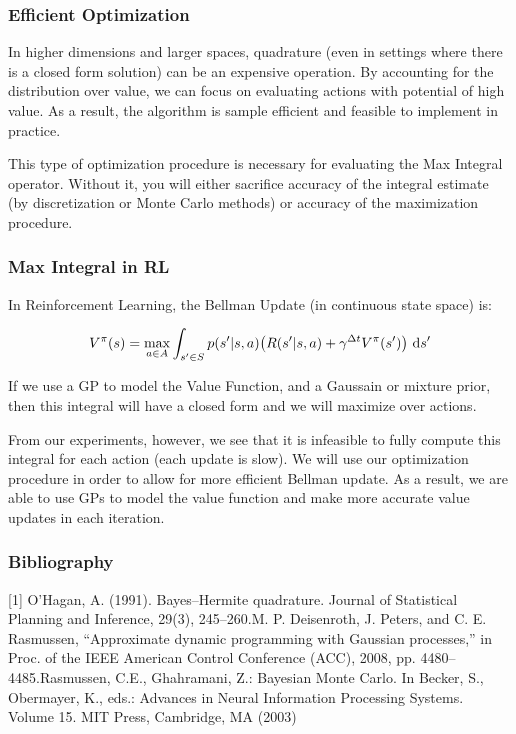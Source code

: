 \documentclass[9pt]{beamer}
\begin{document}
\begin{frame}
\frametitle{Efficient Optimization}
In higher dimensions and larger spaces, quadrature (even in settings where there is a closed form solution) can be an expensive operation. By accounting for the distribution over value, we can focus on evaluating actions with potential of high value. As a result, the algorithm is sample efficient and feasible to implement in practice.\newline

This type of optimization procedure is necessary for evaluating the Max Integral operator. Without it, you will either sacrifice accuracy of the integral estimate (by discretization or Monte Carlo methods) or accuracy of the maximization procedure.\newline \newline
\end{frame}

\begin{frame}
\frametitle{Max Integral in RL}
In Reinforcement Learning, the Bellman Update (in continuous state space) is:

\[V^{\pi}(s) = \max_{a \in A} \int_{s' \in S} p(s'|s,a)\big(R(s'|s,a) + \gamma^{\Delta t}V^{\pi}(s')\big) \ \textup{d}s' \]

If we use a GP to model the Value Function, and a Gaussain or mixture prior, then this integral will have a closed form and we will maximize over actions.

From our experiments, however, we see that it is infeasible to fully compute this integral for each action (each update is slow). We will use our optimization procedure in order to allow for more efficient Bellman update. As a result, we are able to use GPs to model the value function and make more accurate value updates in each iteration.
\end{frame}



\begin{frame}
\frametitle{Bibliography}
[1] O’Hagan, A. (1991). Bayes–Hermite quadrature. Journal of Statistical Planning and Inference, 29(3), 245–260.\newline
[2]   M.  P.  Deisenroth,  J.  Peters,  and  C.  E.  Rasmussen,  “Approximate dynamic programming with Gaussian processes,” in Proc. of the IEEE American Control Conference (ACC), 2008, pp. 4480–4485.\newline
[3] Rasmussen, C.E., Ghahramani, Z.: Bayesian Monte Carlo. In Becker, S., Obermayer, K., eds.: Advances in Neural Information Processing Systems. Volume 15. MIT Press, Cambridge, MA (2003)
\end{frame}

 
\end{document}
